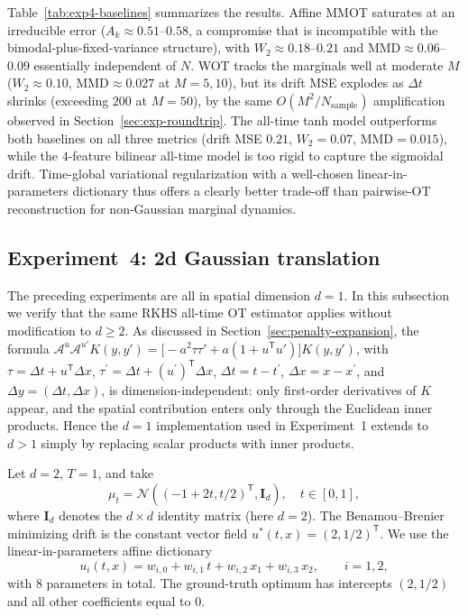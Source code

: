 \documentclass[11pt,leqno]{article}
\theoremstyle{plain}
\theoremstyle{remark}
\theoremstyle{definition}
\numberwithin{equation}{section}
\numberwithin{figure}{section}
\numberwithin{table}{section}
\begin{document}
Table~\ref{tab:exp4-baselines} summarizes the results.  Affine MMOT
saturates at an irreducible error ($A_k\approx 0.51$--$0.58$, a
compromise that is incompatible with the bimodal-plus-fixed-variance
structure), with $W_2\approx 0.18$--$0.21$ and
$\mathrm{MMD}\approx 0.06$--$0.09$ essentially independent of $N$.  WOT
tracks the marginals well at moderate $M$ ($W_2\approx 0.10$,
$\mathrm{MMD}\approx 0.027$ at $M{=}5,10$), but its drift MSE explodes
as $\Delta t$ shrinks (exceeding $200$ at $M{=}50$), by the same
$O(M^2/N_{\text{sample}})$ amplification observed in
Section~\ref{sec:exp-roundtrip}.  The all-time tanh model outperforms
both baselines on all three metrics (drift MSE $0.21$, $W_2=0.07$,
$\mathrm{MMD}=0.015$), while the $4$-feature bilinear all-time model is
too rigid to capture the sigmoidal drift.  Time-global variational
regularization with a well-chosen linear-in-parameters dictionary thus
offers a clearly better trade-off than pairwise-OT reconstruction for
non-Gaussian marginal dynamics.


\subsection{Experiment~4: 2d Gaussian translation}
\label{sec:exp-2d}

The preceding experiments are all in spatial dimension $d=1$.  In this
subsection we verify that the same RKHS all-time OT estimator applies
without modification to $d\ge 2$.  As discussed in
Section~\ref{sec:penalty-expansion}, the formula
$\mathcal{A}^{u}\mathcal{A}^{u'}K(y,y')
 = \bigl[-a^{2}\tau\tau' + a(1+u^{\mathsf{T}} u')\bigr]K(y,y')$,
with $\tau=\Delta t + u^{\mathsf{T}}\Delta x$, $\tau^{\prime}=\Delta t + (u^{\prime})^{\mathsf{T}}\Delta x$, $\Delta t=t-t^{\prime}$, $\Delta x=x-x^{\prime}$, and
$\Delta y=(\Delta t,\Delta x)$, is dimension-independent: only
first-order derivatives of $K$ appear, and the spatial contribution
enters only through the Euclidean inner products. Hence the $d=1$ implementation used in Experiment~1
extends to $d>1$ simply by replacing scalar products with inner
products.


Let $d=2$, $T=1$, and take
\[
  \mu_t = \mathcal{N}((-1+2t, t/2)^{\mathsf{T}},  \mathbf{I}_{d}),
  \quad t\in[0,1],
\]
where $\mathbf{I}_{d}$ denotes the $d\times d$ identity matrix (here
$d=2$). 
The Benamou--Brenier minimizing drift is the constant vector field
$u^*(t,x) = (2, 1/2)^{\mathsf{T}}$.
We use the linear-in-parameters affine dictionary
\[
  u_i(t,x) = w_{i,0} + w_{i,1}\, t + w_{i,2}\, x_1 + w_{i,3}\, x_2,
  \qquad i=1,2,
\]
with $8$ parameters in total.  The ground-truth optimum has
intercepts $(2, 1/2)$ and all other coefficients equal to $0$.
\end{document}
